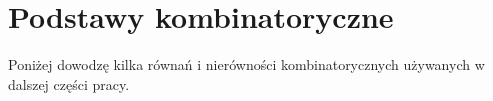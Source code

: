 \documentclass{pracamgr}
\begin{document}
  \section{Podstawy kombinatoryczne}
   Poniżej dowodzę kilka równań i nierówności kombinatorycznych używanych w dalszej części pracy.\newline
   \vspace*{-20pt}    
\end{document}

